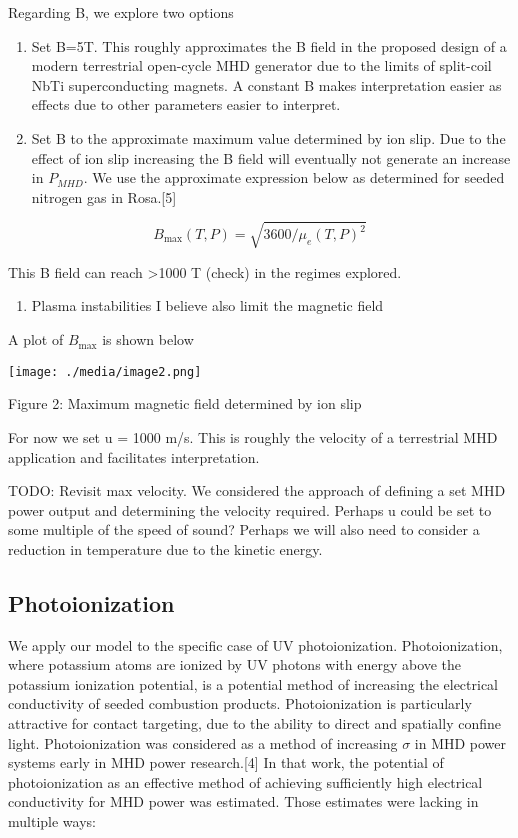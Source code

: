 Regarding B, we explore two options

\begin{enumerate}
\def\labelenumi{\arabic{enumi})}
\item
  Set B=5T. This roughly approximates the B field in the proposed design of a modern terrestrial open-cycle MHD generator due to the limits of split-coil NbTi superconducting magnets. A constant B makes interpretation easier as effects due to other parameters easier to interpret.
\item
  Set B to the approximate maximum value determined by ion slip. Due to the effect of ion slip increasing the B field will eventually not generate an increase in \(P_{MHD}\). We use the approximate expression below as determined for seeded nitrogen gas in Rosa.{[}5{]}
\end{enumerate}

\begin{equation}
B_{\max}(T,P) = \sqrt{3600/\mu_{e}(T,P)^{2}}
\end{equation}


This B field can reach \textgreater1000 T (check) in the regimes explored.

\begin{enumerate}
\def\labelenumi{\alph{enumi}.}
\item
  Plasma instabilities I believe also limit the magnetic field
\end{enumerate}

A plot of \(B_{\max}\) is shown below

\texttt{[image: ./media/image2.png]}

Figure 2: Maximum magnetic field determined by ion slip

For now we set u = 1000 m/s. This is roughly the velocity of a terrestrial MHD application and facilitates interpretation.

TODO: Revisit max velocity. We considered the approach of defining a set MHD power output and determining the velocity required. Perhaps u could be set to some multiple of the speed of sound? Perhaps we will also need to consider a reduction in temperature due to the kinetic energy.

\hypertarget{photoionization}{%
\subsection{Photoionization}\label{photoionization}}

We apply our model to the specific case of UV photoionization. Photoionization, where potassium atoms are ionized by UV photons with energy above the potassium ionization potential, is a potential method of increasing the electrical conductivity of seeded combustion products. Photoionization is particularly attractive for contact targeting, due to the ability to direct and spatially confine light. Photoionization was considered as a method of increasing \(\sigma\) in MHD power systems early in MHD power research.{[}4{]} In that work, the potential of photoionization as an effective method of achieving sufficiently high electrical conductivity for MHD power was estimated. Those estimates were lacking in multiple ways:

